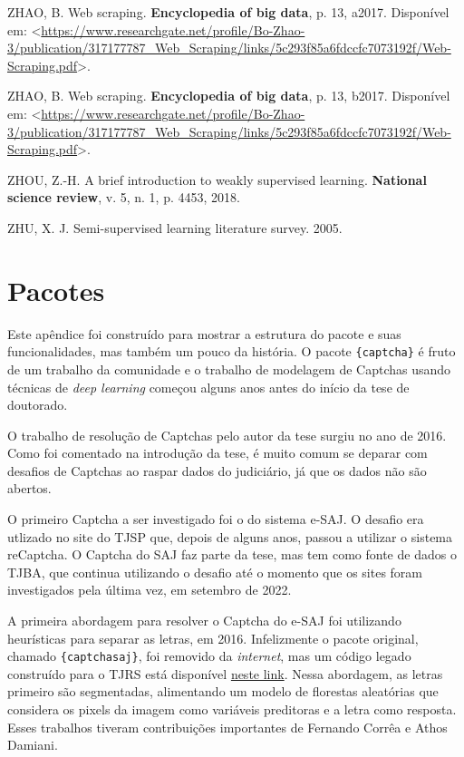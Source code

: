 \documentclass[12pt,twoside,brazilian]{book}
\newlength{\cslhangindent}
\newlength{\cslentryspacingunit} %
\newenvironment{CSLReferences}[2] %
 {%
  \setlength{\parindent}{0pt}
  \ifodd #1
  \let\oldpar\par
  \def\par{\hangindent=\cslhangindent\oldpar}
  \fi
  \setlength{\parskip}{#2\cslentryspacingunit}
 }%
 {}
\begin{document}
\begin{CSLReferences}{0}{1}
\leavevmode{}%
ZHAO, B. Web scraping. \textbf{Encyclopedia of big data}, p. 13, a2017.
Disponível em:
\textless{}\url{https://www.researchgate.net/profile/Bo-Zhao-3/publication/317177787_Web_Scraping/links/5c293f85a6fdccfc7073192f/Web-Scraping.pdf}\textgreater.

\leavevmode{}%
ZHAO, B. Web scraping. \textbf{Encyclopedia of big data}, p. 13, b2017.
Disponível em:
\textless{}\url{https://www.researchgate.net/profile/Bo-Zhao-3/publication/317177787_Web_Scraping/links/5c293f85a6fdccfc7073192f/Web-Scraping.pdf}\textgreater.

\leavevmode{}%
ZHOU, Z.-H. A brief introduction to weakly supervised learning.
\textbf{National science review}, v. 5, n. 1, p. 4453, 2018.

\leavevmode{}%
ZHU, X. J. Semi-supervised learning literature survey. 2005.

\end{CSLReferences}

\appendix
{}

\hypertarget{sec-pacote}{%
\chapter{Pacotes}\label{sec-pacote}}

Este apêndice foi construído para mostrar a estrutura do pacote e suas
funcionalidades, mas também um pouco da história. O pacote
\texttt{\{captcha\}} é fruto de um trabalho da comunidade e o trabalho
de modelagem de Captchas usando técnicas de \emph{deep learning} começou
alguns anos antes do início da tese de doutorado.

O trabalho de resolução de Captchas pelo autor da tese surgiu no ano de
2016. Como foi comentado na introdução da tese, é muito comum se deparar
com desafios de Captchas ao raspar dados do judiciário, já que os dados
não são abertos.

O primeiro Captcha a ser investigado foi o do sistema e-SAJ. O desafio
era utlizado no site do TJSP que, depois de alguns anos, passou a
utilizar o sistema reCaptcha. O Captcha do SAJ faz parte da tese, mas
tem como fonte de dados o TJBA, que continua utilizando o desafio até o
momento que os sites foram investigados pela última vez, em setembro de
2022.

A primeira abordagem para resolver o Captcha do e-SAJ foi utilizando
heurísticas para separar as letras, em 2016. Infelizmente o pacote
original, chamado \texttt{\{captchasaj\}}, foi removido da
\emph{internet}, mas um código legado construído para o TJRS está
disponível
\href{https://github.com/decryptr/captchaTJRS/blob/master/R/tools.R}{neste
link}. Nessa abordagem, as letras primeiro são segmentadas, alimentando
um modelo de florestas aleatórias que considera os pixels da imagem como
variáveis preditoras e a letra como resposta. Esses trabalhos tiveram
contribuições importantes de Fernando Corrêa e Athos Damiani.
\end{document}
